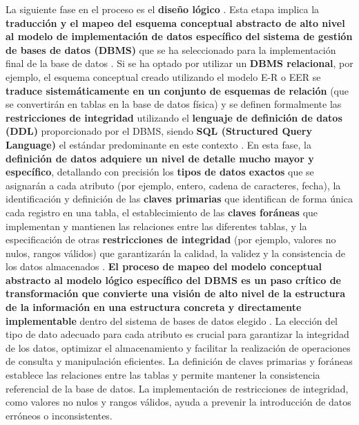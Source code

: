 La siguiente fase en el proceso es el \textbf{diseño lógico} \cite{Fundamentos-de-Sistemas-de-Bases-de-Datos.pdf:61, FBD_1.pdf:1, 12, 13, 22}. Esta etapa implica la \textbf{traducción y el mapeo del esquema conceptual abstracto de alto nivel al modelo de implementación de datos específico del sistema de gestión de bases de datos (DBMS)} que se ha seleccionado para la implementación final de la base de datos \cite{Fundamentos-de-Sistemas-de-Bases-de-Datos.pdf:61}. Si se ha optado por utilizar un \textbf{DBMS relacional}, por ejemplo, el esquema conceptual creado utilizando el modelo E-R o EER se \textbf{traduce sistemáticamente en un conjunto de esquemas de relación} (que se convertirán en tablas en la base de datos física) y se definen formalmente las \textbf{restricciones de integridad} utilizando el \textbf{lenguaje de definición de datos (DDL)} proporcionado por el DBMS, siendo \textbf{SQL (Structured Query Language)} el estándar predominante en este contexto \cite{Fundamentos-de-Sistemas-de-Bases-de-Datos.pdf:61, FBD_1.pdf:1, 12, 13}. En esta fase, la \textbf{definición de datos adquiere un nivel de detalle mucho mayor y específico}, detallando con precisión los \textbf{tipos de datos exactos} que se asignarán a cada atributo (por ejemplo, entero, cadena de caracteres, fecha), la identificación y definición de las \textbf{claves primarias} que identifican de forma única cada registro en una tabla, el establecimiento de las \textbf{claves foráneas} que implementan y mantienen las relaciones entre las diferentes tablas, y la especificación de otras \textbf{restricciones de integridad} (por ejemplo, valores no nulos, rangos válidos) que garantizarán la calidad, la validez y la consistencia de los datos almacenados \cite{Fundamentos-de-Sistemas-de-Bases-de-Datos.pdf:61, FBD_1.pdf:1, 12, 13, 22}. \textbf{El proceso de mapeo del modelo conceptual abstracto al modelo lógico específico del DBMS es un paso crítico de transformación que convierte una visión de alto nivel de la estructura de la información en una estructura concreta y directamente implementable} dentro del sistema de bases de datos elegido \cite{Fundamentos-de-Sistemas-de-Bases-de-Datos.pdf:61}. La elección del tipo de dato adecuado para cada atributo es crucial para garantizar la integridad de los datos, optimizar el almacenamiento y facilitar la realización de operaciones de consulta y manipulación eficientes.  La definición de claves primarias y foráneas establece las relaciones entre las tablas y permite mantener la consistencia referencial de la base de datos.  La implementación de restricciones de integridad, como valores no nulos y rangos válidos, ayuda a prevenir la introducción de datos erróneos o inconsistentes.

